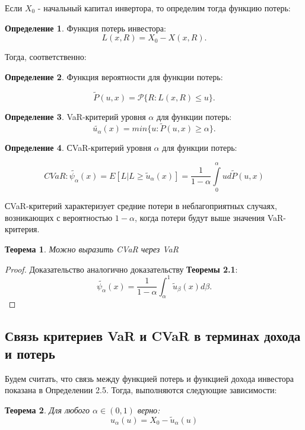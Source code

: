 \documentclass[14pt,a4paper]{article}
\theoremstyle{plain}
\newtheorem{Th}{Теорема}[section]
\theoremstyle{definition}
\newtheorem{Def}{Определение}[section]
\begin{document}
Если $X_0$ - начальный капитал инвертора, то определим тогда функцию потерь:

\begin{Def} \label{main}
Функция потерь инвестора:
$$
L(x, R) = X_0 - X(x, R).
$$
\end{Def}

Тогда, соответственно:

\begin{Def} \label{main}
Функция вероятности для функции потерь:

$$
\tilde{P}(u, x) =  \mathcal{P}\{R:L(x,R) \le u\}.
$$
\end{Def}

\begin{Def} \label{main}
VaR-критерий уровня $\alpha$ для функции потерь:
$$
\tilde{u_\alpha}(x)=min\{u:\tilde{P}(u, x) \ge \alpha\}.
$$
\end{Def}
\begin{Def} \label{main}
СVaR-критерий уровня $\alpha$ для функции потерь:

$$
CVaR: \tilde{\psi_\alpha}(x) = E[L | L \ge \tilde{u}_\alpha (x)] = \frac{1}{1-\alpha} \int\limits_{0}^{\alpha} u d\tilde{P}(u, x)
$$
\end{Def}

СVaR-критерий характеризует средние потери в неблагоприятных случаях, возникающих с вероятностью $1-\alpha$, когда потери будут выше значения VaR-критерия.

\begin{Th} \label{main} Можно выразить CVaR через VaR
\end{Th}
\begin{proof}
Доказательство аналогично доказательству \textbf{Теоремы 2.1}:
$$
\tilde{\psi_\alpha}(x)=\frac{1}{1-\alpha}\int_\alpha^1 \tilde{u}_\beta(x)d\beta.
$$
\end{proof}

 \subsection{Связь критериев VaR и CVaR в терминах дохода и потерь}

Будем считать, что связь между функцией потерь и функцией дохода инвестора показана в Определении 2.5. Тогда, выполняются следующие зависимости:
\vspace{2pc}

\begin{Th} \label{main} Для любого $\alpha \in (0,1)$ верно:
$$
u_\alpha(u) = X_0 - \tilde{u}_\alpha(u)
$$
\end{Th}
\end{document}
